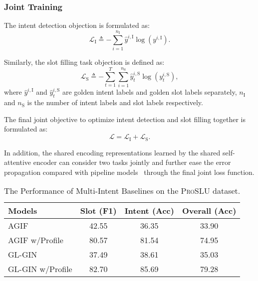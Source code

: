 \documentclass[letterpaper]{article} \usepackage{aaai22}  \usepackage{times}  \usepackage{helvet}  \usepackage{courier}  \usepackage[hyphens]{url}  \usepackage{graphicx} \urlstyle{rm} \def\UrlFont{\rm}  \usepackage{natbib}  \usepackage{caption} \DeclareCaptionStyle{ruled}{labelfont=normalfont,labelsep=colon,strut=off} \frenchspacing  \setlength{\pdfpagewidth}{8.5in}  \setlength{\pdfpageheight}{11in}  \usepackage{algorithm}
\begin{document}
\subsubsection{Joint Training}
The intent detection objection is formulated as:
\begin{equation}
  \mathcal{L}_\mathrm{I} \triangleq-\sum_{i=1}^{n_\mathrm{I}}\hat{{{y}}}^{i,\mathrm{I}} \log \left({{y}}^{i,\mathrm{I}}\right).
\end{equation}

Similarly, the slot filling task objection is defined as: 
\begin{equation}
\mathcal{L}_\mathrm{S} \triangleq-\sum_{t=1}^{T}\sum_{i=1}^{n_\mathrm{S}}{\hat{{{y}}}_{t}^{i,\mathrm{S}}\log \left( {{y}}_{t}^{i,\mathrm{S}}\right)},
\end{equation}
where ${\hat{{{y}}}^{i,\mathrm{I}}}$ and ${\hat{{{y}}}_{t}^{i,\mathrm{S}}}$ are golden intent labels and golden slot labels separately, $n_\mathrm{I}$ and $n_\mathrm{S}$ is the number of intent labels and slot labels respectively.

The final joint objective to optimize intent detection and slot filling together is formulated as:
\begin{equation}
  \mathcal{L} = \mathcal{L}_\mathrm{I} + \mathcal{L}_\mathrm{S}.
\end{equation}

In addition, the shared encoding representations learned by the shared self-attentive encoder can consider two tasks jointly and further ease the error propagation compared with pipeline models~\citep{zhang2016joint} through the final joint loss function. 

\begin{table}[h]
	\centering
	\begin{adjustbox}{width=0.47\textwidth}
		\begin{tabular}{lccc}
			\toprule
            \textbf{Models}
			& \textbf{Slot (F1)}  & \textbf{Intent (Acc)}   & \textbf{Overall (Acc)} \\ 
            \midrule
			AGIF~\citep{qin-etal-2020-agif} & 42.55 & 36.35 & 33.90 \\
			AGIF w/Profile & 80.57 & 81.54 & 74.95 \\
            \midrule
            GL-GIN~\citep{qin-etal-2021-gl} & 37.49 & 38.61 & 35.03\\
			GL-GIN w/Profile & 82.70 & 85.69 & 79.28 \\
            \bottomrule
		\end{tabular}
	\end{adjustbox}
	\caption{
        The Performance of Multi-Intent Baselines on the \textsc{ProSLU} dataset.
    }
	\label{tab:results-multi}
\end{table}
\end{document}
